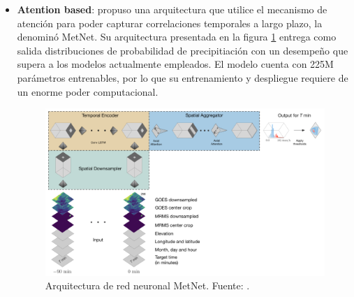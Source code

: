 \begin{itemize}
  \item \textbf{Atention based}: \cite{DBLP:journals/corr/abs-2003-12140} 
  propuso una arquitectura que utilice el mecanismo de atención para poder 
  capturar correlaciones temporales a largo plazo, la denominó MetNet. Su 
  arquitectura presentada en la figura \ref{fig:metnet} entrega como salida 
  distribuciones de probabilidad de precipitiación con un desempeño que supera 
  a los modelos actualmente empleados. El modelo cuenta con 225M parámetros 
  entrenables, por lo que su entrenamiento y despliegue requiere de un enorme 
  poder computacional.
  \begin{figure}[H]
    \centering
    \includegraphics[width=12cm]{E_IMAGENES/3_EstadoArte/metnet}
    \caption[MetNet]{
      Arquitectura de red neuronal MetNet. Fuente: 
      \cite{DBLP:journals/corr/abs-2003-12140}.
    }
    \label{fig:metnet}
  \end{figure}

\end{itemize}



